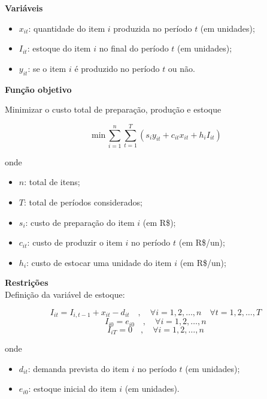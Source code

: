 \documentclass[12pt]{scrartcl}
\newcommand{\un}[1]{\;\textrm{#1}}
\begin{document}
\Large

\textbf{Variáveis}

\begin{itemize}
    \item $x_{it}$: quantidade do item $i$ produzida no período $t$ (em unidades);
    \item $I_{it}$: estoque do item $i$ no final do período $t$ (em unidades);
    \item $y_{it}$: se o item $i$ é produzido no período $t$ ou não.
  \end{itemize}

\textbf{Função objetivo}

Minimizar o custo total de preparação, produção e estoque

\LARGE

\[ \un{min} \, \sum_{i=1}^{n} \sum_{t=1}^{T} \left(s_iy_{it} + c_{it}x_{it} + h_iI_{it}\right) \]

\Large

onde

\begin{itemize}
    \item $n$: total de itens;
    \item $T$: total de períodos considerados;
    \item $s_{i}$: custo de preparação do item $i$ (em R\$);
    \item $c_{it}$: custo de produzir o item $i$ no período $t$ (em R\$/un);
    \item $h_{i}$: custo de estocar uma unidade do item $i$ (em R\$/un);
  \end{itemize}

  \newpage

\textbf{Restrições} \\ 

Definição da variável de estoque:

\[ I_{it} = I_{i, t-1} + x_{it} - d_{it} \quad , \quad \forall i = {1, 2, \dots, n} \quad \forall t = {1, 2, \dots, T} \]
\[ I_{i0} = e_{i0} \quad , \quad \forall i = {1, 2, \dots, n} \]
\[ I_{iT} = 0 \quad , \quad \forall i = {1, 2, \dots, n} \]

onde

\begin{itemize}
    \item $d_{it}$: demanda prevista do item $i$ no período $t$ (em unidades);
    \item $e_{i0}$: estoque inicial do item $i$ (em unidades).
  \end{itemize}
\end{document}
